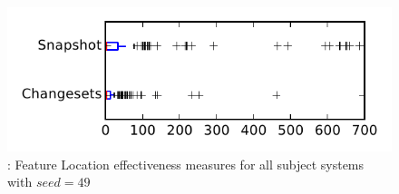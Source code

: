 
\begin{figure}
\centering
\includegraphics[height=0.4\textheight]{figures/flt_seed/rq1_tiny_49}
\caption{\rone: Feature Location effectiveness measures for all subject systems with $seed=49$}
\label{fig:flt_seed:rq1:tiny}
\end{figure}

